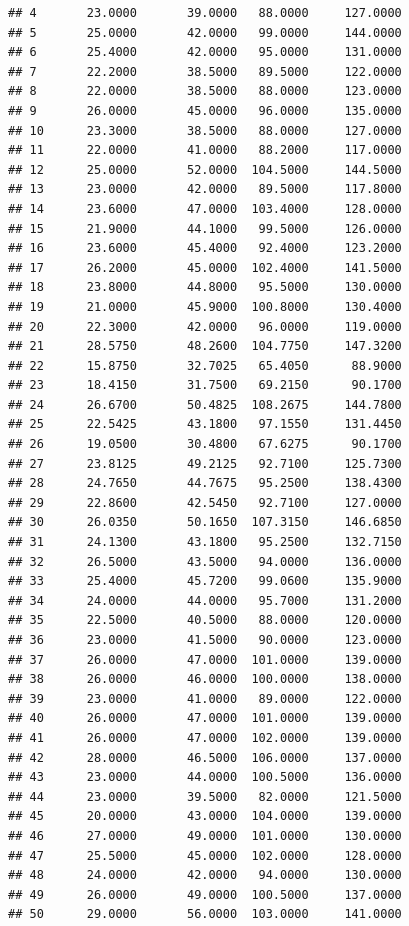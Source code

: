\documentclass[]{article}
\begin{document}
\begin{verbatim}
## 4       23.0000       39.0000   88.0000     127.0000
## 5       25.0000       42.0000   99.0000     144.0000
## 6       25.4000       42.0000   95.0000     131.0000
## 7       22.2000       38.5000   89.5000     122.0000
## 8       22.0000       38.5000   88.0000     123.0000
## 9       26.0000       45.0000   96.0000     135.0000
## 10      23.3000       38.5000   88.0000     127.0000
## 11      22.0000       41.0000   88.2000     117.0000
## 12      25.0000       52.0000  104.5000     144.5000
## 13      23.0000       42.0000   89.5000     117.8000
## 14      23.6000       47.0000  103.4000     128.0000
## 15      21.9000       44.1000   99.5000     126.0000
## 16      23.6000       45.4000   92.4000     123.2000
## 17      26.2000       45.0000  102.4000     141.5000
## 18      23.8000       44.8000   95.5000     130.0000
## 19      21.0000       45.9000  100.8000     130.4000
## 20      22.3000       42.0000   96.0000     119.0000
## 21      28.5750       48.2600  104.7750     147.3200
## 22      15.8750       32.7025   65.4050      88.9000
## 23      18.4150       31.7500   69.2150      90.1700
## 24      26.6700       50.4825  108.2675     144.7800
## 25      22.5425       43.1800   97.1550     131.4450
## 26      19.0500       30.4800   67.6275      90.1700
## 27      23.8125       49.2125   92.7100     125.7300
## 28      24.7650       44.7675   95.2500     138.4300
## 29      22.8600       42.5450   92.7100     127.0000
## 30      26.0350       50.1650  107.3150     146.6850
## 31      24.1300       43.1800   95.2500     132.7150
## 32      26.5000       43.5000   94.0000     136.0000
## 33      25.4000       45.7200   99.0600     135.9000
## 34      24.0000       44.0000   95.7000     131.2000
## 35      22.5000       40.5000   88.0000     120.0000
## 36      23.0000       41.5000   90.0000     123.0000
## 37      26.0000       47.0000  101.0000     139.0000
## 38      26.0000       46.0000  100.0000     138.0000
## 39      23.0000       41.0000   89.0000     122.0000
## 40      26.0000       47.0000  101.0000     139.0000
## 41      26.0000       47.0000  102.0000     139.0000
## 42      28.0000       46.5000  106.0000     137.0000
## 43      23.0000       44.0000  100.5000     136.0000
## 44      23.0000       39.5000   82.0000     121.5000
## 45      20.0000       43.0000  104.0000     139.0000
## 46      27.0000       49.0000  101.0000     130.0000
## 47      25.5000       45.0000  102.0000     128.0000
## 48      24.0000       42.0000   94.0000     130.0000
## 49      26.0000       49.0000  100.5000     137.0000
## 50      29.0000       56.0000  103.0000     141.0000

\end{verbatim}
\end{document}

